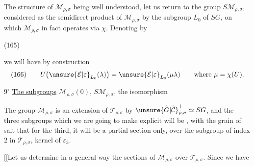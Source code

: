 The structure of $\mathcal M_{\rho,\sigma}$ being well understood,
let us return to the group $S\mathcal M_{\rho,\sigma}$, considered as
the semidirect product of $\mathcal M_{\rho,\sigma}$ by the subgroup
$L_0$ of $SG$, on which $\mathcal M_{\rho,\sigma}$ in fact operates
via $\chi$. Denoting by

\begin{samepage}
\noindent (165)\quad
{}
\end{samepage}

we will have by  construction
\[
\text{(166)}\qquad
U\bigl(\unsure{\mathcal E|\varepsilon}_{L_0}(\lambda)\bigr)
=\unsure{\mathcal E|\varepsilon}_{L_0}(\mu\lambda)
\qquad\text{where }\mu=\chi(U).
\]




 \textcircled{$9^\circ$} \uline{The subgroups}
$\mathcal M_{\rho,\sigma}(0)$,
$S\mathcal M_{\rho,\sigma}$, the isomorphism

The group $\mathcal M_{\rho,\sigma}$ is an extension of $\mathcal T_{\rho,\sigma}$ by
$\unsure{\widetilde G|\widetilde{\mathcal C}}^+_{\rho,\sigma}\simeq SG$, and the three subgroups which we are going
to make explicit will be ,  with the
grain of salt that for the third, it will be a
partial section only, over the
subgroup  of index $2$ in $\mathcal T_{\rho,\sigma}$, kernel of
$\varepsilon_3$.

$[\![$Let us determine in a general way the sections
of $\mathcal M_{\rho,\sigma}$ over $\mathcal T_{\rho,\sigma}$. Since we have

